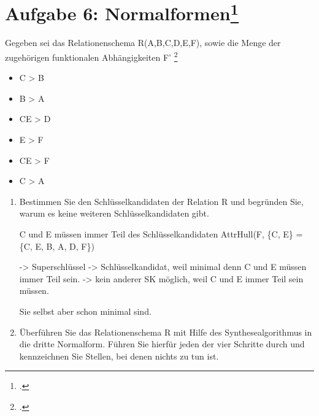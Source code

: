 \documentclass{lehramt-informatik-aufgabe}
\begin{document}
\section{Aufgabe 6: Normalformen\footcite{examen:66116:2018:03}}

Gegeben sei das Relationenschema R(A,B,C,D,E,F), sowie die Menge der
zugehörigen funktionalen Abhängigkeiten F' \footcite{db:pu:wh}

\begin{itemize}
\item \liFA C > B
\item \liFA B > A
\item \liFA CE > D
\item \liFA E > F
\item \liFA CE > F
\item \liFA C > A
\end{itemize}

\begin{enumerate}
\item Bestimmen Sie den Schlüsselkandidaten der Relation R und begründen
Sie, warum es keine weiteren Schlüsselkandidaten gibt.

\begin{antwort}
 C und E müssen immer Teil des Schlüsselkandidaten
AttrHull(F, \{C, E\} = \{C, E, B, A, D, F\})

-> Superschlüssel
-> Schlüsselkandidat, weil minimal denn C und E müssen immer Teil sein.
-> kein anderer SK möglich, weil C und E immer Teil sein müssen.

Sie selbst aber schon minimal sind.
\end{antwort}

\item Überführen Sie das Relationenschema R mit Hilfe des
Synthesealgorithmus in die dritte
Normalform. Führen Sie hierfür jeden der vier
Schritte durch und kennzeichnen Sie Stellen, bei denen nichts zu tun
ist.
\end{enumerate}
\end{document}
